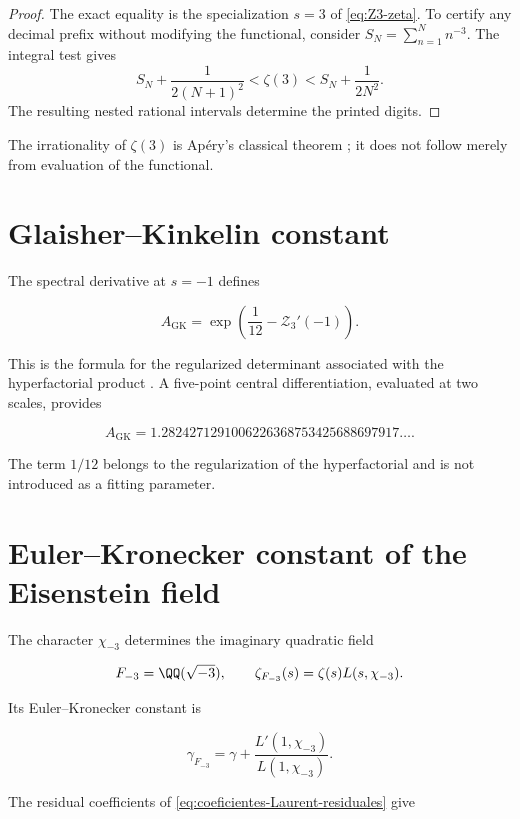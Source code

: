 \begin{proof}
The exact equality is the specialization $s=3$ of \eqref{eq:Z3-zeta}.
To certify any decimal prefix without modifying the functional,
consider $S_N=\sum_{n=1}^{N}n^{-3}$. The integral test gives
\[
 S_N+\frac1{2(N+1)^2}
 <\zeta(3)<
 S_N+\frac1{2N^2}.
\]
The resulting nested rational intervals determine the printed
digits.
\end{proof}

The irrationality of $\zeta(3)$ is Apéry's classical theorem
\cite{Apery1979}; it does not follow merely from evaluation of the functional.

\section{Glaisher--Kinkelin constant}

The spectral derivative at $s=-1$ defines

\begin{equation}
 \boxed{
 A_{\mathrm{GK}}
 =\exp\!\left(\frac1{12}-\mathcal Z_3'(-1)\right)}.
 \label{eq:glaisher-kinkelin-espectral}
\end{equation}

This is the formula for the regularized determinant associated with the
hyperfactorial product \cite{Vardi1988}. A five-point central differentiation,
evaluated at two scales, provides

\[
 A_{\mathrm{GK}}
 =1.2824271291006226368753425688697917\ldots.
\]

The term $1/12$ belongs to the regularization of the hyperfactorial and is not
introduced as a fitting parameter.

\section{Euler--Kronecker constant of the Eisenstein field}

The character $\chi_{-3}$ determines the imaginary quadratic field

\[
 F_{-3}=\QQ(\sqrt{-3}),
 \qquad
 \zeta_{F_{-3}}(s)=\zeta(s)L(s,\chi_{-3}).
\]

Its Euler--Kronecker constant is

\begin{equation}
 \boxed{
 \gamma_{F_{-3}}
 =\gamma+\frac{L'(1,\chi_{-3})}{L(1,\chi_{-3})}}.
 \label{eq:euler-kronecker-eisenstein}
\end{equation}

The residual coefficients of
\eqref{eq:coeficientes-Laurent-residuales} give

